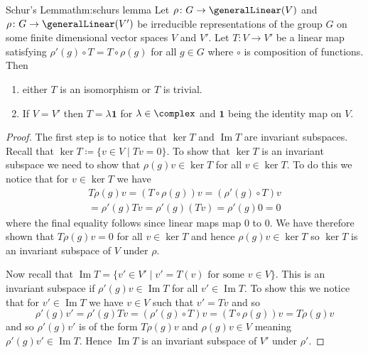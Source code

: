 \documentclass[fleqn]{NotesClass}
\DeclareMathOperator{\image}{Im}
\newcommand*{\ident}{\mathbf{1}}
\begin{document}
    \begin{thm}{Schur's Lemma}{thm:schurs lemma}
        Let \(\rho\colon G \to \generalLinear(V)\) and \(\rho\colon G \to \generalLinear(V')\) be irreducible representations of the group \(G\) on some finite dimensional vector spaces \(V\) and \(V'\).
        Let \(T \colon V \to V'\) be a linear map satisfying \(\rho'(g) \circ T = T \circ \rho(g)\) for all \(g \in G\) where \(\circ\) is composition of functions.
        Then
        \begin{enumerate}
            \item either \(T\) is an isomorphism or \(T\) is trivial.
            \item If \(V = V'\) then \(T = \lambda\ident\) for \(\lambda \in \complex\) and \(\ident\) being the identity map on \(V\).
        \end{enumerate}
        \begin{proof}
            The first step is to notice that \(\ker T\) and \(\image T\) are invariant subspaces.
            Recall that \(\ker T \coloneqq \{v \in V \mid Tv = 0\}\).
            To show that \(\ker T\) is an invariant subspace we need to show that \(\rho(g)v \in \ker T\) for all \(v \in \ker T\).
            To do this we notice that for \(v\in\ker T\) we have
            \begin{multline}
                T\rho(g)v = (T \circ \rho(g))v = (\rho'(g) \circ T)v\\
                = \rho'(g)Tv = \rho'(g)(Tv) = \rho'(g)0 = 0
            \end{multline}
            where the final equality follows since linear maps map 0 to 0.
            We have therefore shown that \(T\rho(g)v = 0\) for all \(v \in \ker T\) and hence \(\rho(g)v \in \ker T\) so \(\ker T\) is an invariant subspace of \(V\) under \(\rho\).
            
            Now recall that \(\image T = \{v' \in V' \mid v' = T(v) \text{ for some } v \in V\}\).
            This is an invariant subspace if \(\rho'(g)v \in \image T\) for all \(v' \in \image T\).
            To show this we notice that for \(v' \in \image T\) we have \(v\in V\) such that \(v' = Tv\) and so
            \begin{equation}
                \rho'(g)v' = \rho'(g)Tv = (\rho'(g) \circ T)v = (T\circ \rho(g))v = T\rho(g)v
            \end{equation}
            and so \(\rho'(g)v'\) is of the form \(T\rho(g)v\) and \(\rho(g)v \in V\) meaning \(\rho'(g) v' \in \image T\).
            Hence \(\image T\) is an invariant subspace of \(V'\) under \(\rho'\).
            

\end{proof}
\end{thm}
\end{document}
